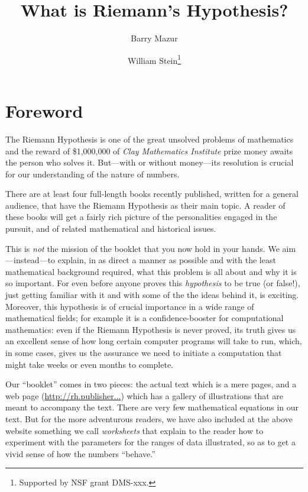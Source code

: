 \documentclass[11pt]{article}
\title{What is Riemann's Hypothesis?}
\author{Barry Mazur \and William Stein\footnote{Supported by NSF grant DMS-xxx.}}
\theoremstyle{plain}
\theoremstyle{definition}
\numberwithin{equation}{section}
\numberwithin{figure}{section}
\numberwithin{table}{section}
\begin{document}
\maketitle
\tableofcontents

\section{\label{foreword}Foreword}

\bigskip

The Riemann Hypothesis is one of the great unsolved problems of
mathematics and the reward of \$1,000,000 of {\em Clay Mathematics
  Institute} prize money awaits the person who solves it. But---with
or without money---its resolution is crucial for our understanding of
the nature of numbers.

There are at least four full-length books recently published, written
for a general audience, that have the Riemann Hypothesis as their main
topic.  A reader of these books will get a fairly rich picture of the
personalities engaged in the pursuit, and of related mathematical and
historical issues.
     
This is {\em not} the mission of the booklet that you now hold in your
hands. We aim---instead---to explain, in as direct a manner as
possible and with the least mathematical background required, what
this problem is all about and why it is so important. For even before
anyone proves this {\em hypothesis} to be true (or false!), just
getting familiar with it and with some of the the ideas behind it, is
exciting.  Moreover, this hypothesis is of crucial importance in a
wide range of mathematical fields; for example it is a
confidence-booster for computational mathematics: even if the Riemann
Hypothesis is never proved, its truth gives us an excellent sense of
how long certain computer programs will take to run, which, in some
cases, gives us the assurance we need to initiate a computation that
might take weeks or even months to complete.

      
Our ``booklet'' comes in two pieces: the actual text which is a mere
\pageref{lastpage} pages, and a web page (\url{http://rh.publisher...}) 
which has a gallery of illustrations that
are meant to accompany the text.  There are very few mathematical
equations in our text.  But for the more adventurous readers, we have
also included at the above website something we call {\em worksheets}
that explain to the reader how to experiment with the parameters for
the ranges of data illustrated, so as to get a vivid sense of how the
numbers ``behave.''
 
\end{document}
